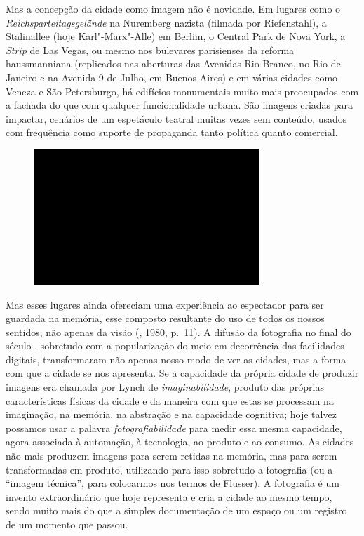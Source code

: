 Mas a concepção da cidade como imagem não é novidade. Em lugares como o
\emph{Reichsparteitagsgelände} na Nuremberg nazista (filmada por
Riefenstahl), a Stalinallee (hoje Karl"-Marx"-Alle) em Berlim, o Central
Park de Nova York, a \emph{Strip} de Las Vegas, ou mesmo nos bulevares
parisienses da reforma haussmanniana (replicados nas aberturas das
Avenidas Rio Branco, no Rio de Janeiro e na Avenida 9 de Julho, em
Buenos Aires) e em várias cidades como Veneza e São Petersburgo, há
edifícios monumentais muito mais preocupados com a fachada do que com
qualquer funcionalidade urbana. São imagens criadas para impactar,
cenários de um espetáculo teatral muitas vezes sem conteúdo, usados com
frequência como suporte de propaganda tanto política quanto comercial.

\begin{figure}[!ht]

\centering
 \includegraphics[width=85mm]{./imgs/im1.jpg}
\caption{\tiny{}}

\end{figure}

Mas esses lugares ainda ofereciam uma experiência ao espectador para ser
guardada na memória, esse composto resultante do uso de todos os nossos
sentidos, não apenas da visão (, 1980, p.~11). A difusão da
fotografia no final do século , sobretudo com a popularização do meio
em decorrência das facilidades digitais, transformaram não apenas nosso
modo de ver as cidades, mas a forma com que a cidade se nos apresenta.
Se a capacidade da própria cidade de produzir imagens era chamada por
Lynch de \emph{imaginabilidade}, produto das próprias características
físicas da cidade e da maneira com que estas se processam na imaginação,
na memória, na abstração e na capacidade cognitiva; hoje talvez possamos
usar a palavra \emph{fotografiabilidade} para medir essa mesma
capacidade, agora associada à automação, à tecnologia, ao produto e ao
consumo. As cidades não mais produzem imagens para serem retidas na
memória, mas para serem transformadas em produto, utilizando para isso
sobretudo a fotografia (ou a ``imagem técnica'', para colocarmos nos
termos de Flusser). A fotografia é um invento extraordinário que hoje
representa e cria a cidade ao mesmo tempo, sendo muito mais do que a
simples documentação de um espaço ou um registro de um momento que
passou.

